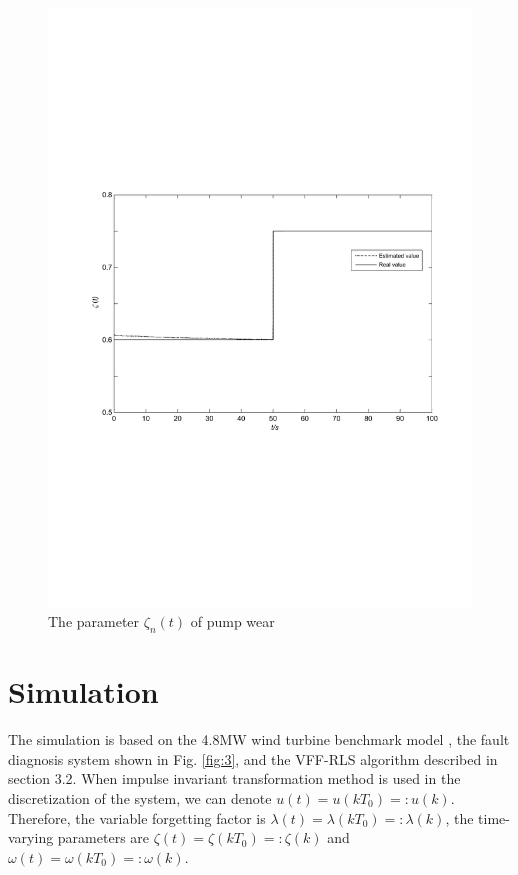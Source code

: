 \documentclass{article}
\begin{document}
\begin{figure}[!htb]
  \centering
  \includegraphics[width=\hsize]{fig6b.pdf}
  \caption{The parameter $\zeta_n(t)$ of pump wear}
  \label{fig:6b}
\end{figure}


\section{Simulation}

The simulation is based on the 4.8MW wind turbine benchmark model
\cite{ref:17}, the fault diagnosis system shown in Fig. \ref{fig:3},
and the VFF-RLS algorithm described in section 3.2.
When impulse invariant transformation method is used in the
discretization of the system, we can denote $u(t)=u(kT_0)=:u(k)$.
Therefore, the variable forgetting factor is $\lambda(t)=\lambda(kT_0)=:\lambda(k)$, the time-varying parameters are
$\zeta(t)=\zeta(kT_0)=:\zeta(k)$ and $\omega(t)=\omega(kT_0)=:\omega(k)$.
\end{document}
